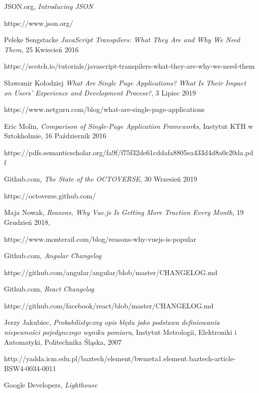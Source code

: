 \cleardoublepage
{}
{}


\begin{thebibliography}{99}

JSON.org,
\textit{Introducing JSON}

https://www.json.org/

Peleke Sengstacke
\textit{JavaScript Transpilers: What They Are and Why We Need Them},
25 Kwiecień 2016

https://scotch.io/tutorials/javascript-transpilers-what-they-are-why-we-need-them

Sławomir Kołodziej
\textit{What Are Single Page Applications? What Is Their Impact on Users’ Experience and Development Process?},
3 Lipiec 2019

https://www.netguru.com/blog/what-are-single-page-applications

Eric Molin, 
\textit{Comparison of Single-Page Application Frameworks},
Instytut KTH w Sztokholmie,
16 Październik 2016

https://pdfs.semanticscholar.org/fa9f/f75f32de61cddafa8805ea433d4d8a0e20da.pdf

Github.com, \textit{The State of the OCTOVERSE},
30 Wrzesień 2019

https://octoverse.github.com/

Maja Nowak,
\textit{Reasons, Why Vue.js Is Getting More Traction Every Month},
19 Grudzień 2018, 

https://www.monterail.com/blog/reasons-why-vuejs-is-popular

Github.com,
\textit{Angular Changelog}

https://github.com/angular/angular/blob/master/CHANGELOG.md

Github.com,
\textit{React Changelog}

https://github.com/facebook/react/blob/master/CHANGELOG.md

Jerzy Jakubiec,
\textit{Probabilistyczny opis błędu jako podstawa definiowania niepewności pojedynczego wyniku pomiaru},
Instytut Metrologii, Elektroniki i Automatyki, Politechnika Śląska,
2007


http://yadda.icm.edu.pl/baztech/element/bwmeta1.element.baztech-article-BSW4-0034-0011

Google Developers,
\textit{Lighthouse}


\end{thebibliography}
